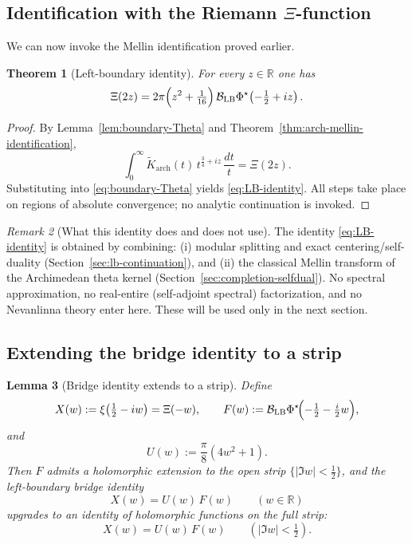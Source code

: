 \documentclass[11pt]{amsart}
\newtheorem{theorem}{Theorem}[section]
\newtheorem{lemma}[theorem]{Lemma}
\theoremstyle{definition}
\theoremstyle{remark}
\newtheorem{remark}[theorem]{Remark}
\newcommand{\R}{\mathbb{R}}
\begin{document}
\subsection{Identification with the Riemann $\Xi$-function}

We can now invoke the Mellin identification proved earlier.

\begin{theorem}[Left-boundary identity]
\label{thm:LB-identity}
For every $z\in\R$ one has
\begin{equation}
\label{eq:LB-identity}
\Xi(2z)
=
2\pi\Bigl(z^2+\tfrac1{16}\Bigr)\,
\mathcal B_{\mathrm{LB}}\Phi^{\star}\!\left(-\tfrac12+iz\right).
\end{equation}
\end{theorem}

\begin{proof}
By Lemma~\ref{lem:boundary-Theta} and Theorem~\ref{thm:arch-mellin-identification},
\[
\int_{0}^{\infty}\widetilde K_{\mathrm{arch}}(t)\,
t^{\frac34+iz}\,\frac{dt}{t}
=
\Xi(2z).
\]
Substituting into \eqref{eq:boundary-Theta} yields \eqref{eq:LB-identity}. All steps take place on regions of absolute
convergence; no analytic continuation is invoked.
\end{proof}

\begin{remark}[What this identity does and does not use]
The identity \eqref{eq:LB-identity} is obtained by combining:
(i) modular splitting and exact centering/self-duality (Section~\ref{sec:lb-continuation}),
and (ii) the classical Mellin transform of the Archimedean theta kernel
(Section~\ref{sec:completion-selfdual}). No spectral approximation, no real-entire (self-adjoint spectral)
factorization, and no Nevanlinna theory enter here. These will be used only in
the next section.
\end{remark}


\subsection{Extending the bridge identity to a strip}

\begin{lemma}[Bridge identity extends to a strip]\label{lem:bridge-strip}
Define
\[
X(w):=\xi\!\left(\tfrac12-iw\right)=\Xi(-w),
\qquad
F(w):=\mathcal B_{\mathrm{LB}}\Phi^\star\!\Bigl(-\tfrac12-\tfrac{i}{2}w\Bigr),
\]
and
\[
U(w):=\frac{\pi}{8}(4w^2+1).
\]
Then $F$ admits a holomorphic extension to the open strip $\{|\Im w|<\tfrac12\}$, and the
left-boundary bridge identity
\begin{equation}\label{eq:bridge-real}
X(w)=U(w)\,F(w)
\qquad (w\in\R)
\end{equation}
upgrades to an identity of holomorphic functions on the full strip:
\begin{equation}\label{eq:bridge-strip}
X(w)=U(w)\,F(w)
\qquad (|\Im w|<\tfrac12).
\end{equation}
\end{lemma}
\end{document}
